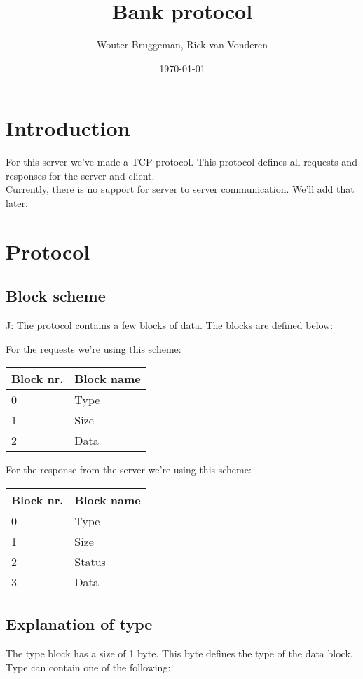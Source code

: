\documentclass[12pt]{article}
\title{Bank protocol}
\author{Wouter Bruggeman, Rick van Vonderen}
\date{\today}
\begin{document}
\maketitle
\newpage

\tableofcontents
\newpage

\section{Introduction}
For this server we've made a TCP protocol. This protocol defines all requests
and responses for the server and client.\\
Currently, there is no support for server to server communication. We'll add that later.
\newpage

\section{Protocol} \label{hfst:protocol}
\subsection{Block scheme} \label{hfst:scheme}J:
The protocol contains a few blocks of data. The blocks are defined below:

For the requests we're using this scheme:\\
\begin{tabular}{| p{2cm} | p{5cm} |}
	\hline
	\textbf{Block nr.} & \textbf{Block name} \\ \hline
	0 & Type \\ \hline
	1 & Size \\ \hline
	2 & Data \\ \hline
\end{tabular}

For the response from the server we're using this scheme:\\
\begin{tabular}{| p{2cm} | p{5cm} |}
	\hline
	\textbf{Block nr.} & \textbf{Block name} \\ \hline
	0 & Type \\ \hline
	1 & Size \\ \hline
	2 & Status \\ \hline
	3 & Data \\ \hline
\end{tabular}

\subsection{Explanation of type} \label{hfst:type}
The type block has a size of 1 byte. This byte defines the type of the data block.\\
Type can contain one of the following:
\end{document}
